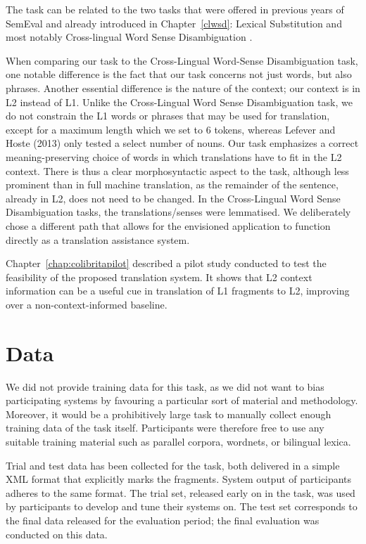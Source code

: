 The task can be related to the two tasks that were offered in previous years of
SemEval and already introduced in Chapter~\ref{clwsd}: Lexical Substitution
\citep{CLLS} and most notably Cross-lingual Word Sense Disambiguation
\citep{Lefever2013}. 

When comparing our task to the Cross-Lingual Word-Sense Disambiguation task,
one notable difference is the fact that our task concerns not just words, but
also phrases. Another essential difference is the nature of the context; our
context is in L2 instead of L1. Unlike the Cross-Lingual Word Sense
Disambiguation task, we do not constrain the L1 words or phrases that may be
used for translation, except for a maximum length which we set to 6 tokens,
whereas Lefever and Hoste (2013) only tested a select number of nouns. Our task
emphasizes a correct meaning-preserving choice of words in which translations
have to fit in the L2 context. There is thus a clear morphosyntactic aspect to
the task, although less prominent than in full machine translation, as the
remainder of the sentence, already in L2, does not need to be changed.  In the
Cross-Lingual Word Sense Disambiguation tasks, the translations/senses were
lemmatised. We deliberately chose a different path that allows for the
envisioned application to function directly as a translation assistance system.

Chapter~\ref{chap:colibritapilot} described a pilot study conducted to test the
feasibility of the proposed translation system. It shows that L2 context
information can be a useful cue in translation of L1 fragments to L2, improving
over a non-context-informed baseline.


\section{Data}
\label{sec:data}

We did not provide training data for this task, as we did not want to bias
participating systems by favouring a particular sort of material and
methodology. Moreover, it would be a prohibitively large task to manually
collect enough training data of the task itself. Participants were therefore
free to use any suitable training material such as parallel corpora, wordnets,
or bilingual lexica.

Trial and test data has been collected for the task, both delivered in a simple
XML format that explicitly marks the fragments. System output of participants
adheres to the same format. The trial set, released early on in the task, was
used by participants to develop and tune their systems on. The test set
corresponds to the final data released for the evaluation period; the final
evaluation was conducted on this data.

